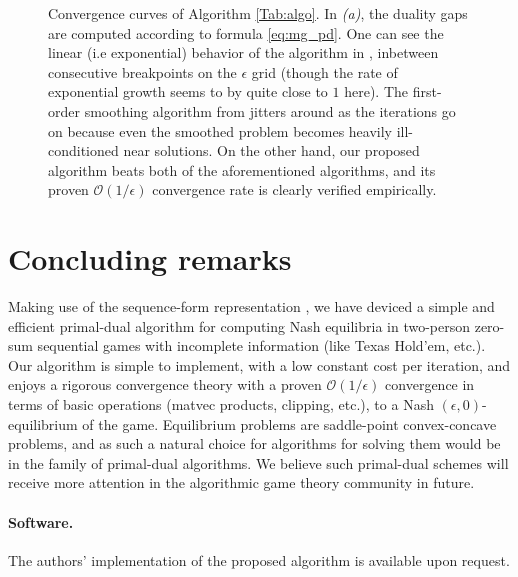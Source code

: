 \documentclass{article} %
\begin{document}
\begin{figure}[!htpb]
  \caption{Convergence curves of Algorithm
    \ref{Tab:algo}. In \textit{(a)}, the duality gaps
    are computed according to formula \eqref{eq:mg_pd}. One can see
    the linear (i.e exponential) behavior of the algorithm in
    \cite{gilpinfirst}, inbetween consecutive breakpoints on the
    $\epsilon$ grid (though the rate of exponential growth seems to by
    quite close to $1$ here). The first-order smoothing algorithm from
    \cite{nesterov2005a} jitters around as the iterations go on
    because even the smoothed problem becomes heavily ill-conditioned
    near solutions. On the other hand, our proposed
    algorithm beats both of the aforementioned algorithms, and
  its proven $\mathcal{O}(1/\epsilon)$ convergence rate is clearly
  verified empirically.}
  \label{Tab:dgap_curve}
\end{figure}

\section{Concluding remarks}
Making use of the sequence-form representation
\cite{koller1992complexity,von1996efficient,vonequilibrium}, we have
deviced a simple and efficient primal-dual algorithm for computing
Nash equilibria in two-person zero-sum sequential games with
incomplete information (like Texas Hold'em, etc.). Our algorithm is
simple to implement, with a low constant cost per iteration, and
enjoys a rigorous convergence theory with a proven
$\mathcal{O}(1/\epsilon)$ convergence in terms of basic operations
(matvec products, clipping, etc.), to a Nash
$(\epsilon,0)$-equilibrium of the game. Equilibrium problems are
saddle-point convex-concave problems, and as
such a natural choice for algorithms for solving them would be in the
family of primal-dual algorithms. We believe such primal-dual
schemes will receive more attention in the algorithmic game theory
community in future.

\paragraph{Software.} The authors' implementation of the proposed
algorithm is available upon request.

\end{document}

